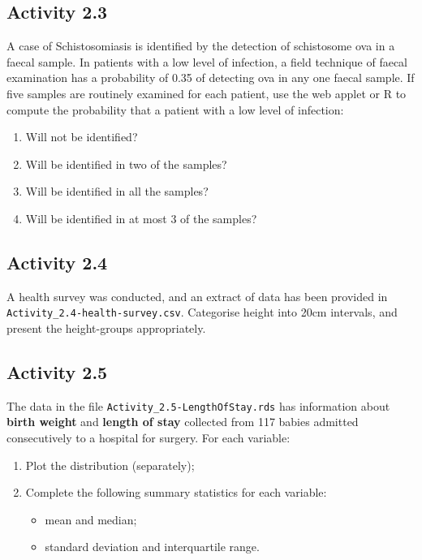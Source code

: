 \documentclass[
  a4paper,
]{memoir}
\providecommand{\tightlist}{%
  \setlength{\itemsep}{0pt}\setlength{\parskip}{0pt}}
\begin{document}
\subsection*{Activity 2.3}\label{activity-2.3}

A case of Schistosomiasis is identified by the detection of schistosome
ova in a faecal sample. In patients with a low level of infection, a
field technique of faecal examination has a probability of 0.35 of
detecting ova in any one faecal sample. If five samples are routinely
examined for each patient, use the web applet or R to compute the
probability that a patient with a low level of infection:

\begin{enumerate}
\def\labelenumi{\alph{enumi})}
\tightlist
\item
  Will not be identified?
\item
  Will be identified in two of the samples?
\item
  Will be identified in all the samples?
\item
  Will be identified in at most 3 of the samples?
\end{enumerate}

\subsection*{Activity 2.4}\label{activity-2.4}

A health survey was conducted, and an extract of data has been provided
in \texttt{Activity\_2.4-health-survey.csv}. Categorise height into 20cm
intervals, and present the height-groups appropriately.

\subsection*{Activity 2.5}\label{activity-2.5}

The data in the file \texttt{Activity\_2.5-LengthOfStay.rds} has
information about \textbf{birth weight} and \textbf{length of stay}
collected from 117 babies admitted consecutively to a hospital for
surgery. For each variable:

\begin{enumerate}
\def\labelenumi{\alph{enumi}.}
\item
  Plot the distribution (separately);
\item
  Complete the following summary statistics for each variable:

  \begin{itemize}
  \tightlist
  \item
    mean and median;
  \item
    standard deviation and interquartile range.
  \end{itemize}
\end{enumerate}
\end{document}
